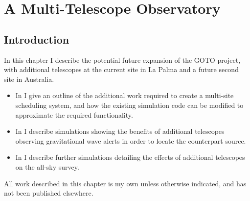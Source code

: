 \chapter{A Multi-Telescope Observatory}
\label{chap:multiscope}
\chaptoc{}


\newpage
\section{Introduction}
\label{sec:multiscope_intro}
\begin{colsection}

In this chapter I describe the potential future expansion of the GOTO project, with additional telescopes at the current site in La Palma and a future second site in Australia.
%
\begin{itemize}
    \item In  I give an outline of the additional work required to create a multi-site scheduling system, and how the existing simulation code can be modified to approximate the required functionality.
    \item In  I describe simulations showing the benefits of additional telescopes observing gravitational wave alerts in order to locate the counterpart source.
    \item In  I describe further simulations detailing the effects of additional telescopes on the all-sky survey.
\end{itemize}
%
All work described in this chapter is my own unless otherwise indicated, and has not been published elsewhere.

\end{colsection}


\newpage
